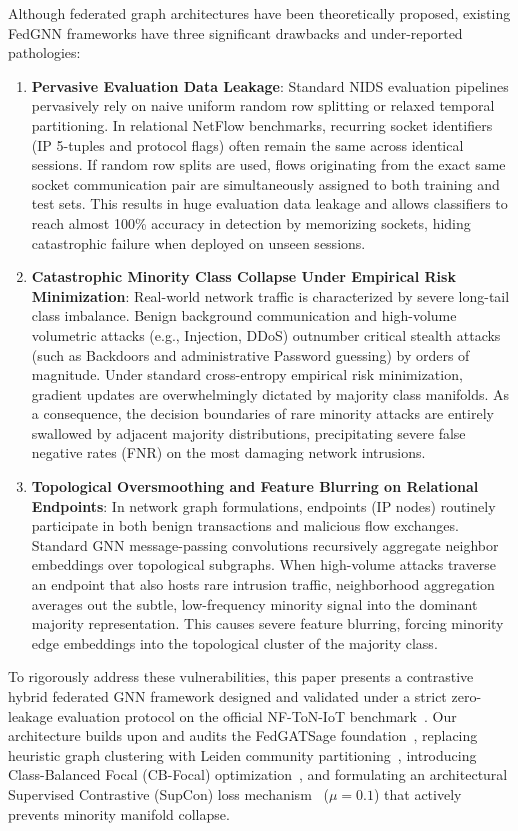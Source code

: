 \documentclass[journal,onecolumn]{IEEEtran}
\begin{document}
Although federated graph architectures have been theoretically proposed, existing FedGNN frameworks have three significant drawbacks and under-reported pathologies:
\begin{enumerate}
    \item \textbf{Pervasive Evaluation Data Leakage}: Standard NIDS evaluation pipelines pervasively rely on naive uniform random row splitting or relaxed temporal partitioning. In relational NetFlow benchmarks, recurring socket identifiers (IP 5-tuples and protocol flags) often remain the same across identical sessions. If random row splits are used, flows originating from the exact same socket communication pair are simultaneously assigned to both training and test sets. This results in huge evaluation data leakage and allows classifiers to reach almost 100\% accuracy in detection by memorizing sockets, hiding catastrophic failure when deployed on unseen sessions.
    \item \textbf{Catastrophic Minority Class Collapse Under Empirical Risk Minimization}: Real-world network traffic is characterized by severe long-tail class imbalance. Benign background communication and high-volume volumetric attacks (e.g., Injection, DDoS) outnumber critical stealth attacks (such as Backdoors and administrative Password guessing) by orders of magnitude. Under standard cross-entropy empirical risk minimization, gradient updates are overwhelmingly dictated by majority class manifolds. As a consequence, the decision boundaries of rare minority attacks are entirely swallowed by adjacent majority distributions, precipitating severe false negative rates (FNR) on the most damaging network intrusions.
    \item \textbf{Topological Oversmoothing and Feature Blurring on Relational Endpoints}: In network graph formulations, endpoints (IP nodes) routinely participate in both benign transactions and malicious flow exchanges. Standard GNN message-passing convolutions recursively aggregate neighbor embeddings over topological subgraphs. When high-volume attacks traverse an endpoint that also hosts rare intrusion traffic, neighborhood aggregation averages out the subtle, low-frequency minority signal into the dominant majority representation. This causes severe feature blurring, forcing minority edge embeddings into the topological cluster of the majority class.
\end{enumerate}

To rigorously address these vulnerabilities, this paper presents a contrastive hybrid federated GNN framework designed and validated under a strict zero-leakage evaluation protocol on the official NF-ToN-IoT benchmark~\cite{alsaedi2020toniot}. Our architecture builds upon and audits the FedGATSage foundation~\cite{altfaily2025fedgatsage}, replacing heuristic graph clustering with Leiden community partitioning~\cite{traag2019leiden}, introducing Class-Balanced Focal (CB-Focal) optimization~\cite{cui2019cbloss, lin2017focal}, and formulating an architectural Supervised Contrastive (SupCon) loss mechanism~\cite{khosla2020supcon} ($\mu = 0.1$) that actively prevents minority manifold collapse.
\end{document}

